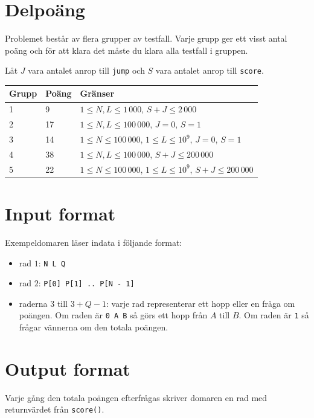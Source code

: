 \section*{Delpoäng}
Problemet består av flera grupper av testfall. Varje grupp ger ett visst antal poäng och för att klara det måste du klara alla testfall i gruppen.

Låt $J$ vara antalet anrop till \texttt{jump} och $S$ vara antalet anrop till \texttt{score}.

\begin{tabular}{|l|l|l|}
  \hline
  \textbf{Grupp} & \textbf{Poäng} & \textbf{Gränser} \\ \hline
  1 & 9 & $1 \le N, L \le 1\,000$,  $S + J \le 2\,000$ \\ \hline
  2 & 17 & $1 \le N, L \le 100\,000$, $J = 0$, $S = 1$ \\ \hline
  3 & 14 & $1 \le N \le 100\,000$, $1 \le L \le 10^9$, $J = 0$, $S = 1$ \\ \hline
  4 & 38 & $1 \le N, L \le 100\,000$, $S + J \le 200\,000$ \\ \hline
  5 & 22 & $1 \le N \le 100\,000$, $1 \le L \le 10^9$, $S + J \le 200\,000$ \\ \hline
\end{tabular}

\section*{Input format}
Exempeldomaren läser indata i följande format:

\begin{itemize}
  \item rad $1$: \texttt{N L Q}
  \item rad $2$: \texttt{P[0] P[1] .. P[N - 1]}
  \item raderna $3$ till $3 + Q - 1$: varje rad representerar ett hopp eller en fråga om poängen.
    Om raden är \texttt{0 A B} så görs ett hopp från $A$ till $B$. Om raden är \texttt{1} så frågar vännerna om den totala poängen.
\end{itemize}

\section*{Output format}
Varje gång den totala poängen efterfrågas skriver domaren en rad med returnvärdet från \texttt{score()}.
